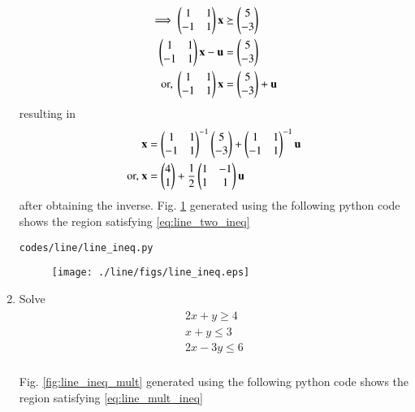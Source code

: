 \begin{enumerate}[label=\arabic*.,ref=\thesubsection.\theenumi]
\begin{align}
\implies 
\begin{pmatrix}1 & 1 \\ -1 & 1\end{pmatrix}\mathbf{x}  &\succeq \begin{pmatrix}5\\-3\end{pmatrix}
\\
\begin{pmatrix}1 & 1 \\ -1 & 1\end{pmatrix}\mathbf{x}  -\mathbf{u}&=\begin{pmatrix}5\\-3\end{pmatrix}
\\
\text{or, }
\begin{pmatrix}1 & 1 \\ -1 & 1\end{pmatrix}\mathbf{x} &= \begin{pmatrix}5\\-3\end{pmatrix} +\mathbf{u}
\end{align}
%
resulting in 
\begin{align}
\mathbf{x} &= \begin{pmatrix}1 & 1 \\ -1 & 1\end{pmatrix}^{-1}\begin{pmatrix}5\\-3\end{pmatrix} +\begin{pmatrix}1 & 1 \\ -1 & 1\end{pmatrix}^{-1}\mathbf{u}
\\
\text{or, } \mathbf{x} &= \begin{pmatrix}4\\1\end{pmatrix} +\frac{1}{2}\begin{pmatrix}1 & -1 \\ 1 & 1\end{pmatrix}\mathbf{u}
\end{align}
%
after obtaining the  inverse.
%
 Fig. \ref{fig:line_ineq} generated using the following python code shows the region satisfying \eqref{eq:line_two_ineq}

\begin{lstlisting}
codes/line/line_ineq.py
\end{lstlisting}
%
\begin{figure}[!ht]
\texttt{[image: ./line/figs/line\_ineq.eps]}
\caption{}
\label{fig:line_ineq}
\end{figure}
%
\item Solve 
\begin{align}
\begin{split}
2x+y \geq 4
\\ 
x+y \leq 3
\\ 
2x-3y \leq 6
\end{split}
\label{eq:line_mult_ineq}
\end{align}
%
\\
\solution  Fig. \ref{fig:line_ineq_mult} generated using the following python code shows the region satisfying \eqref{eq:line_mult_ineq}


\end{enumerate}
